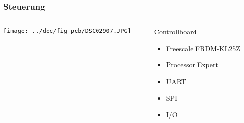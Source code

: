 \begin{frame}
    \frametitle{Steuerung}
    \begin{columns}
        \begin{column}{0.50\textwidth}
            \centering
            \texttt{[image: ../doc/fig\_pcb/DSC02907.JPG]}
        \end{column}
        \begin{column}{0.50\textwidth}
            \begin{block}{Controllboard}
                \begin{itemize}
                    \item Freescale FRDM-KL25Z
                    \item Processor Expert
                    \item UART
                    \item SPI
                    \item I/O
                \end{itemize}
            \end{block}
        \end{column}
    \end{columns}
\end{frame}
